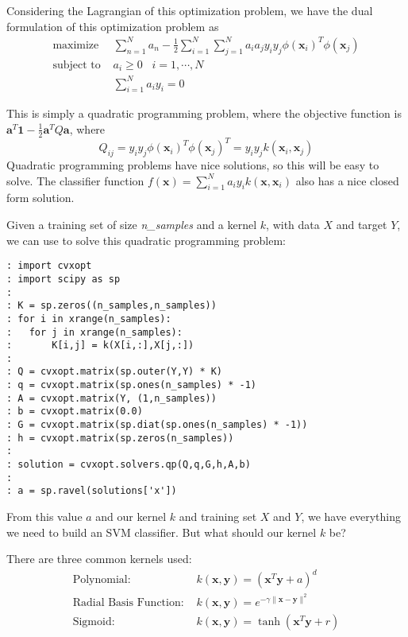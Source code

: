 Considering the Lagrangian of this optimization problem, we have the dual formulation of this optimization problem as
\begin{align*}
\text{maximize } & \sum_{n=1}^{N} a_{n} - \frac{1}{2} \sum_{i=1}^{N}\sum_{j=1}^{N} a_{i}a_{j}y_{i}y_{j}\phi(\mathbf{x}_{i})^{T}\phi(\mathbf{x}_{j}) \\
\text{subject to } & a_{i} \geq 0 \; \; \; i = 1, \cdots, N \\
 & \sum_{i=1}^{N} a_{i}y_{i} = 0
\end{align*}

This is simply a quadratic programming problem, where the objective function is $\mathbf{a}^{T}\mathbf{1} - \frac{1}{2} \mathbf{a}^{T}Q\mathbf{a}$, where
\begin{equation*}
Q_{ij} = y_{i}y_{j}\phi(\mathbf{x}_{i})^{T}\phi(\mathbf{x}_{j})^{T} = y_{i}y_{j}k(\mathbf{x}_{i},\mathbf{x}_{j})
\end{equation*}
Quadratic programming problems have nice solutions, so this will be easy to solve. The classifier function $f(\mathbf{x}) = \sum_{i=1}^{N} a_{i}y_{i}k(\mathbf{x},\mathbf{x}_{i})$ also has a nice closed form solution.

Given a training set of size \emph{n\_samples} and a kernel $k$, with data $X$ and target $Y$, we can use  to solve this quadratic programming problem:
\begin{lstlisting}
: import cvxopt
: import scipy as sp
:
: K = sp.zeros((n_samples,n_samples))
: for i in xrange(n_samples):
: 	for j in xrange(n_samples):
:		K[i,j] = k(X[i,:],X[j,:])
:
: Q = cvxopt.matrix(sp.outer(Y,Y) * K)
: q = cvxopt.matrix(sp.ones(n_samples) * -1)
: A = cvxopt.matrix(Y, (1,n_samples))
: b = cvxopt.matrix(0.0)
: G = cvxopt.matrix(sp.diat(sp.ones(n_samples) * -1))
: h = cvxopt.matrix(sp.zeros(n_samples))
:
: solution = cvxopt.solvers.qp(Q,q,G,h,A,b)
:
: a = sp.ravel(solutions['x'])
\end{lstlisting}

From this value $a$ and our kernel $k$ and training set $X$ and $Y$, we have everything we need to build an SVM classifier. But what should our kernel $k$ be?

There are three common kernels used:
\begin{align*}
\text{Polynomial: } & k(\mathbf{x},\mathbf{y}) = (\mathbf{x}^{T}\mathbf{y} + a)^{d} \\
\text{Radial Basis Function: } & k(\mathbf{x},\mathbf{y}) = e^{-\gamma \| \mathbf{x} - \mathbf{y} \|^{2}} \\
\text{Sigmoid: } & k(\mathbf{x},\mathbf{y}) = \tanh \left(\mathbf{x}^{T}\mathbf{y} + r \right)
\end{align*}

